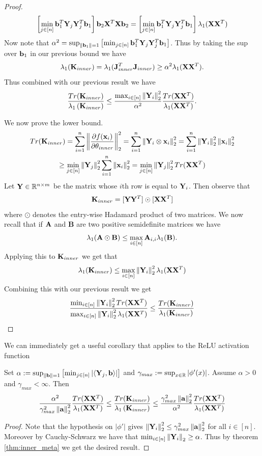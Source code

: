 \begin{proof}
\begin{gather*}
\left[\min_{j \in [n]} \mathbf b_1^T \mathbf{Y}_j \mathbf{Y}_j^T \mathbf b_1\right] \mathbf b_2 \mathbf{X}^T \mathbf{X} \mathbf b_2 = \left[\min_{j \in [n]} \mathbf b_1^T \mathbf{Y}_j \mathbf{Y}_j^T \mathbf b_1\right] \lambda_1(\mathbf{X} \mathbf{X}^T)
\end{gather*}
Now note that $\alpha^2 = \sup_{\left\lVert\mathbf b_1\right\rVert = 1} \left[\min_{j \in [n]} \mathbf b_1^T \mathbf{Y}_j \mathbf{Y}_j^T \mathbf b_1\right]$.  Thus by taking the sup over $\mathbf b_1$ in our previous bound we have
\[ \lambda_1(\mathbf{K}_{inner}) = \lambda_1(\mathbf{J}_{inner}^T \mathbf{J}_{inner}) \geq \alpha^2 \lambda_1(\mathbf{X} \mathbf{X}^T). \]
Thus combined with our previous result we have
\[ \frac{Tr(\mathbf{K}_{inner})}{\lambda_1 \left(\mathbf{K}_{inner}\right)} \leq \frac{\max_{i \in [n]} \left\lVert\mathbf{Y}_i\right\rVert_2^2}{\alpha^2} \frac{Tr(\mathbf{X} \mathbf{X}^T)}{\lambda_1(\mathbf{X} \mathbf{X}^T)}. \]
\par
We now prove the lower bound.
\begin{gather*}
Tr(\mathbf{K}_{inner}) = \sum_{i = 1}^n \left\lVert\frac{\partial f(\mathbf{x}_i)}{\partial \mathbf{\theta}_{inner}}\right\rVert_2^2 = \sum_{i = 1}^n \left\lVert\mathbf{Y}_i \otimes \mathbf{x}_i\right\rVert_2^2 = \sum_{i = 1}^n \left\lVert\mathbf{Y}_i\right\rVert_2^2 \left\lVert\mathbf{x}_i\right\rVert_2^2 \\
\geq \min_{j \in [n]} \left\lVert\mathbf{Y}_j\right\rVert_2^2 \sum_{i = 1}^n \left\lVert\mathbf{x}_i\right\rVert_2^2 =
\min_{j \in [n]} \left\lVert\mathbf{Y}_j\right\rVert_2^2 Tr(\mathbf{X} \mathbf{X}^T)
\end{gather*}
Let $\mathbf{Y} \in \mathbb{R}^{n \times m}$ be the matrix whose $i$th row is equal to $\mathbf{Y}_i$.  Then observe that
\[ \mathbf{K}_{inner} = [\mathbf{Y} \mathbf{Y}^T] \odot [\mathbf{X} \mathbf{X}^T] \]
where $\odot$ denotes the entry-wise Hadamard product of two matrices.  We now recall that if $\mathbf{A}$ and $\mathbf{B}$ are two positive semidefinite matrices we have \cite[Lemma 2]{solt_mod_over}
\[ \lambda_1(\mathbf{A} \odot \mathbf{B}) \leq \max_{i \in [n]} \mathbf{A}_{i, i} \lambda_1(\mathbf{B}). \]
Applying this to $\mathbf{K}_{inner}$ we get that
\[ \lambda_1(\mathbf{K}_{inner}) \leq \max_{i \in [n]} \left\lVert\mathbf{Y}_i\right\rVert_2^2 \lambda_1(\mathbf{X} \mathbf{X}^T)  \]
Combining this with our previous result we get
\[ \frac{\min_{i \in [n]} \left\lVert\mathbf{Y}_i\right\rVert_2^2 Tr(\mathbf{X} \mathbf{X}^T)}{\max_{i \in [n]} \left\lVert\mathbf{Y}_i\right\rVert_2^2 \lambda_1(\mathbf{X} \mathbf{X}^T)} \leq \frac{Tr(\mathbf{K}_{inner})}{\lambda_1(\mathbf{K}_{inner})} \]
\end{proof}


\par
We can immediately get a useful corollary that applies to the ReLU activation function
\begin{corollary}\label{cor:meta_relu_bound}
Set $\alpha := \sup_{\left\lVert\mathbf b\right\rVert = 1} \left[\min_{j \in [n]} |\langle \mathbf{Y}_j, \mathbf b \rangle|\right]$ and $\gamma_{max} := \sup_{x \in \mathbb{R}} |\phi'(x)|$.  Assume $\alpha > 0$ and $\gamma_{max} < \infty$.  Then
\[\frac{\alpha^2}{\gamma_{max}^2 \left\lVert\mathbf{a}\right\rVert_2^2} \frac{Tr(\mathbf{X} \mathbf{X}^T)}{\lambda_1(\mathbf{X} \mathbf{X}^T)} \leq \frac{Tr(\mathbf{K}_{inner})}{\lambda_1 \left(\mathbf{K}_{inner}\right)} \leq \frac{\gamma_{max}^2 \left\lVert\mathbf{a}\right\rVert_2^2}{\alpha^2} \frac{Tr(\mathbf{X} \mathbf{X}^T)}{\lambda_1(\mathbf{X} \mathbf{X}^T)} \]
\end{corollary}
\begin{proof}
Note that the hypothesis on $|\phi'|$ gives $\left\lVert\mathbf{Y}_i\right\rVert_2^2 \leq \gamma_{max}^2 \left\lVert\mathbf{a}\right\rVert_2^2$ for all $i \in [n]$.  Moreover by Cauchy-Schwarz we have that $\min_{i \in [n]} \left\lVert\mathbf{Y}_i\right\rVert_2 \geq \alpha$.  Thus by theorem \ref{thm:inner_meta} we get the desired result.
\end{proof}

